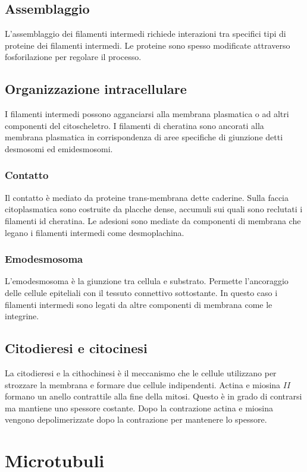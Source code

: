 	\subsection{Assemblaggio}
	L'assemblaggio dei filamenti intermedi richiede interazioni tra specifici tipi di proteine dei filamenti intermedi.
	Le proteine sono spesso modificate attraverso fosforilazione per regolare il processo.

	\subsection{Organizzazione intracellulare}
	I filamenti intermedi possono agganciarsi alla membrana plasmatica o ad altri componenti del  citoscheletro.
	I filamenti di cheratina sono ancorati alla membrana plasmatica in corrispondenza di aree specifiche di giunzione detti desmosomi ed emidesmosomi.

		\subsubsection{Contatto}
		Il contatto \`e mediato da proteine trans-membrana dette caderine.
		Sulla faccia citoplasmatica sono costruite da placche dense, accumuli sui quali sono reclutati i filamenti id cheratina.
		Le adesioni sono mediate da componenti di membrana che legano i filamenti intermedi come desmoplachina.

		\subsubsection{Emodesmosoma}
		L'emodesmosoma \`e la giunzione tra cellula e substrato.
		Permette l'ancoraggio delle cellule epiteliali con il tessuto connettivo sottostante.
		In questo caso i filamenti intermedi sono legati da altre componenti di membrana come le integrine.

	\subsection{Citodieresi e citocinesi}
	La citodieresi e la cithochinesi \`e il meccanismo che le cellule utilizzano per strozzare la membrana e formare due cellule indipendenti.
	Actina e miosina $II$ formano un anello contrattile alla fine della mitosi.
	Questo \`e in grado di contrarsi ma mantiene uno spessore costante.
	Dopo la contrazione actina e miosina vengono depolimerizzate dopo la contrazione per mantenere lo spessore.

\section{Microtubuli}

